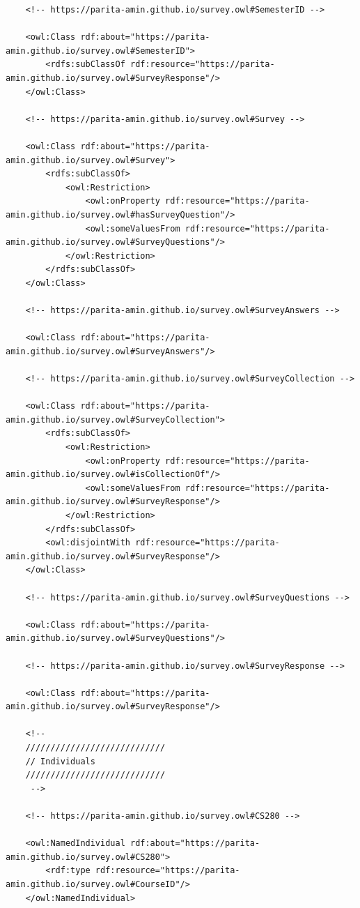 \begin{lstlisting}
    <!-- https://parita-amin.github.io/survey.owl#SemesterID -->

    <owl:Class rdf:about="https://parita-amin.github.io/survey.owl#SemesterID">
        <rdfs:subClassOf rdf:resource="https://parita-amin.github.io/survey.owl#SurveyResponse"/>
    </owl:Class>
    
    <!-- https://parita-amin.github.io/survey.owl#Survey -->

    <owl:Class rdf:about="https://parita-amin.github.io/survey.owl#Survey">
        <rdfs:subClassOf>
            <owl:Restriction>
                <owl:onProperty rdf:resource="https://parita-amin.github.io/survey.owl#hasSurveyQuestion"/>
                <owl:someValuesFrom rdf:resource="https://parita-amin.github.io/survey.owl#SurveyQuestions"/>
            </owl:Restriction>
        </rdfs:subClassOf>
    </owl:Class>
    
    <!-- https://parita-amin.github.io/survey.owl#SurveyAnswers -->

    <owl:Class rdf:about="https://parita-amin.github.io/survey.owl#SurveyAnswers"/>
    
    <!-- https://parita-amin.github.io/survey.owl#SurveyCollection -->

    <owl:Class rdf:about="https://parita-amin.github.io/survey.owl#SurveyCollection">
        <rdfs:subClassOf>
            <owl:Restriction>
                <owl:onProperty rdf:resource="https://parita-amin.github.io/survey.owl#isCollectionOf"/>
                <owl:someValuesFrom rdf:resource="https://parita-amin.github.io/survey.owl#SurveyResponse"/>
            </owl:Restriction>
        </rdfs:subClassOf>
        <owl:disjointWith rdf:resource="https://parita-amin.github.io/survey.owl#SurveyResponse"/>
    </owl:Class>
    
    <!-- https://parita-amin.github.io/survey.owl#SurveyQuestions -->

    <owl:Class rdf:about="https://parita-amin.github.io/survey.owl#SurveyQuestions"/>
    
    <!-- https://parita-amin.github.io/survey.owl#SurveyResponse -->

    <owl:Class rdf:about="https://parita-amin.github.io/survey.owl#SurveyResponse"/>
    
    <!-- 
    ////////////////////////////
    // Individuals
    ////////////////////////////
     -->

    <!-- https://parita-amin.github.io/survey.owl#CS280 -->

    <owl:NamedIndividual rdf:about="https://parita-amin.github.io/survey.owl#CS280">
        <rdf:type rdf:resource="https://parita-amin.github.io/survey.owl#CourseID"/>
    </owl:NamedIndividual>
    

\end{lstlisting}
